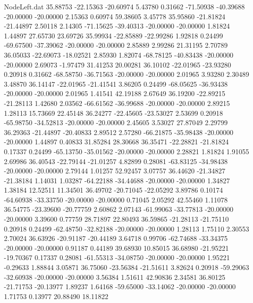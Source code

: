 \begin{filecontents}{NodeLeft.dat}
  35.88753  -22.15363  -20.60974     5.43780    0.31662  -71.50938  -40.39688  -20.00000  -20.00000    2.15363    0.60974   59.38605    3.45778
  35.95860  -21.81824  -21.44897     2.50118    2.14305  -71.15625  -39.40313  -20.00000  -20.00000    1.81824    1.44897   27.65730   23.69726
  35.99934  -22.85889  -22.99286     1.92818    0.24499  -69.67500  -37.39062  -20.00000  -20.00000    2.85889    2.99286   21.31195    2.70789
  36.05033  -22.69073  -18.02521     2.85930    1.82074  -68.78125  -40.83438  -20.00000  -20.00000    2.69073   -1.97479   31.41253   20.00281
  36.10102  -22.01965  -23.93280     0.20918    0.31662  -68.58750  -36.71563  -20.00000  -20.00000    2.01965    3.93280    2.30489    3.48870
  36.14147  -22.01965  -21.41541     3.86205    0.24499  -68.05625  -36.93438  -20.00000  -20.00000    2.01965    1.41541   42.19188    2.67649
  36.19200  -22.89215  -21.28113     1.42680    2.03562  -66.61562  -36.99688  -20.00000  -20.00000    2.89215    1.28113   15.73669   22.45148
  36.24277  -22.45605  -23.53027     2.53699    0.20918  -65.98750  -34.52813  -20.00000  -20.00000    2.45605    3.53027   27.87049    2.29799
  36.29363  -21.44897  -20.40833     2.89512    2.57280  -66.21875  -35.98438  -20.00000  -20.00000    1.44897    0.40833   31.85284   28.30668
  36.35471  -22.28821  -21.81824     0.17337    0.24499  -65.13750  -35.01562  -20.00000  -20.00000    2.28821    1.81824    1.91055    2.69986
  36.40543  -22.79144  -21.01257     4.82899    0.28081  -63.83125  -34.98438  -20.00000  -20.00000    2.79144    1.01257   52.92457    3.07757
  36.44620  -21.34827  -21.38184     1.14031    1.03287  -64.22188  -34.44688  -20.00000  -20.00000    1.34827    1.38184   12.52511   11.34501
  36.49702  -20.71045  -22.05292     3.89786    0.10174  -64.60938  -33.33750  -20.00000  -20.00000    0.71045    2.05292   42.55460    1.11078
  36.54775  -23.39600  -20.77759     2.60862    2.07143  -61.99063  -33.77813  -20.00000  -20.00000    3.39600    0.77759   28.71897   22.80493
  36.59865  -21.28113  -21.75110     0.20918    0.24499  -62.48750  -32.82188  -20.00000  -20.00000    1.28113    1.75110    2.30553    2.70024
  36.63926  -20.91187  -20.44189     3.64718    0.99706  -62.74688  -33.34375  -20.00000  -20.00000    0.91187    0.44189   39.68930   10.85015
  36.68980  -21.95221  -19.70367     0.17337    0.28081  -61.55313  -34.08750  -20.00000  -20.00000    1.95221   -0.29633    1.88844    3.05871
  36.75060  -23.56384  -21.51611     3.82624    0.20918  -59.29063  -32.60938  -20.00000  -20.00000    3.56384    1.51611   42.90836    2.34581
  36.80125  -21.71753  -20.13977     1.89237    1.64168  -59.65000  -33.14062  -20.00000  -20.00000    1.71753    0.13977   20.88490   18.11822

\end{filecontents}
